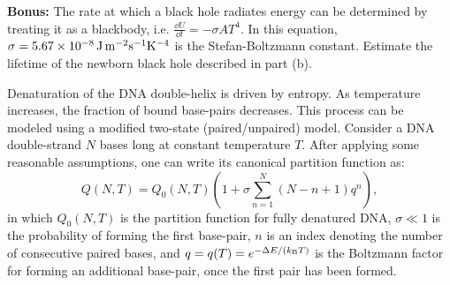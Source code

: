 \smallskip \subp
{\bf Bonus:} The rate at which a black hole radiates energy
can be determined by treating it as a blackbody, i.e.
$ \frac{\dd U}{\dd t} = - \sigma A T^4 $.
In this equation,
$ \sigma = \rm 5.67\times 10^{-8}\, J\, m^{-2} s^{-1} K^{-4} $
is the Stefan-Boltzmann constant.
Estimate the lifetime of the newborn black hole described
in part (b).

\bigskip {}
Denaturation of the DNA double-helix is driven by entropy.
As temperature increases, the fraction of bound base-pairs decreases.
This process can be modeled using a modified
two-state (paired/unpaired) model.
Consider a DNA double-strand $N$ bases long
at constant temperature $T$.
After applying some reasonable assumptions,
one can write its canonical partition function as:
\begin{equation}
Q(N, T) = Q_0(N, T) \left(
1 + \sigma \sum_{n=1}^{N} (N - n + 1) q^n \right),
\label{eq:Qzipper}
\end{equation}
in which $Q_0(N, T)$ is the partition function for fully denatured DNA,
$\sigma \ll 1$ is the probability of forming the first base-pair,
$n$ is an index denoting the number of consecutive paired bases, 
and $q = q(T) = e^{- \Delta E/(k_{\rm\scriptscriptstyle B} T)}$ is
the Boltzmann factor for forming an additional base-pair,
once the first pair has been formed.

